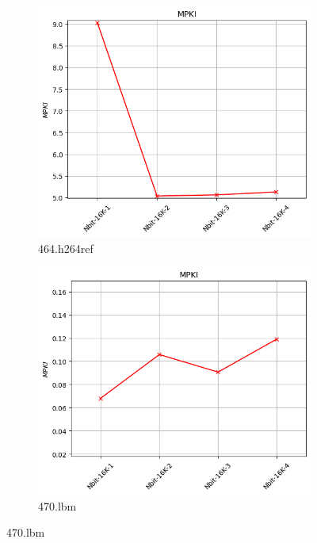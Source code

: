 \documentclass{article}
\begin{document}
\begin{figure}[H]
    \ContinuedFloat
    \centering

    \begin{subfigure}[b]{0.45\textwidth}
        \includegraphics[width=\textwidth]{figures/5_3/464.h264ref.cslab_branch_preds_ref.out.png}
        \caption{464.h264ref}
        \label{fig:plot13}
    \end{subfigure}
    \hfill
    \begin{subfigure}[b]{0.45\textwidth}
        \includegraphics[width=\textwidth]{figures/5_3/470.lbm.cslab_branch_preds_ref.out.png}
        \caption{470.lbm}
        \label{fig:plot14}
    \end{subfigure}


\end{figure}
\end{document}
